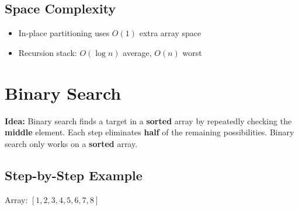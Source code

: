 \documentclass{article}
\begin{document}
\subsection{Space Complexity}
\begin{itemize}
  \item In-place partitioning uses $O(1)$ extra array space
  \item Recursion stack: $O(\log n)$ average, $O(n)$ worst
\end{itemize}


\section{Binary Search}

\textbf{Idea:} Binary search finds a target in a \textbf{sorted} array by repeatedly checking the
\textbf{middle} element.  
Each step eliminates \textbf{half} of the remaining possibilities. Binary search only works on a \textbf{sorted} array.

\newpage

\subsection{Step-by-Step Example}

Array: \([1,2,3,4,5,6,7,8]\)
\end{document}
